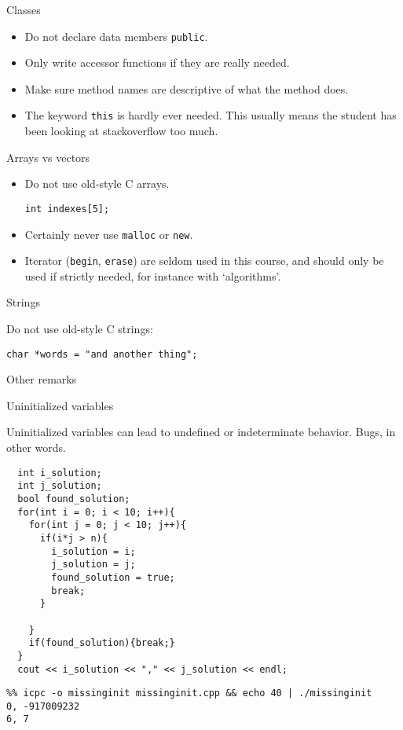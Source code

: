  {Classes}

\begin{itemize}
\item Do not declare data members \lstinline{public}.
\item Only write accessor functions if they are really needed.
\item Make sure method names are descriptive of what the method does.
\item The keyword \lstinline{this} is hardly ever needed.
  This usually means the student has been looking at stackoverflow too much.
\end{itemize}

 {Arrays vs vectors}

\begin{itemize}
\item Do not use old-style C arrays.
\begin{lstlisting}
int indexes[5];    
\end{lstlisting}
\item Certainly never use \lstinline{malloc} or \lstinline{new}.
\item Iterator (\lstinline{begin}, \lstinline{erase}) are
  seldom used in this course, and should only be used if strictly needed,
  for instance with `algorithms'.
\end{itemize}

 {Strings}

Do not use old-style C strings:
\begin{lstlisting}
char *words = "and another thing";
\end{lstlisting}

 {Other remarks}

 {Uninitialized variables}

Uninitialized variables can lead to undefined or indeterminate behavior.
Bugs, in other words.

\lstset{language=C++}
\begin{lstlisting}
  int i_solution;
  int j_solution;
  bool found_solution;
  for(int i = 0; i < 10; i++){
    for(int j = 0; j < 10; j++){
      if(i*j > n){
        i_solution = i;
        j_solution = j;
        found_solution = true;
        break;
      }

    }
    if(found_solution){break;}
  }
  cout << i_solution << "," << j_solution << endl;
\end{lstlisting}

\begin{verbatim}
%% icpc -o missinginit missinginit.cpp && echo 40 | ./missinginit
0, -917009232
6, 7
\end{verbatim}

